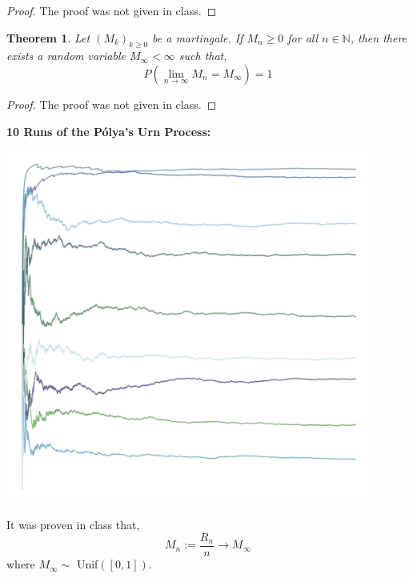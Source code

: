 \documentclass{tufte-handout}
\newtheorem{thm}{Theorem}
\begin{document}
\begin{proof}
  The proof was not given in class.
\end{proof}

\begin{thm}
  Let $(M_k)_{k \geq 0}$ be a martingale. If $M_n \geq 0$ for all $n \in \mathbb{N}$, then there exists a random variable $M_{\infty} < \infty$ such that,
  \[P\left(\lim _{n \rightarrow \infty} M_{n}=M_{\infty}\right)=1\]
\end{thm}

\begin{proof}
  The proof was not given in class.
\end{proof}

\begin{marginfigure}
      \textbf{10 Runs of the P\'{o}lya's Urn Process:}
      \begin{center}
        \includegraphics[width=0.9\textwidth]{fig-28.png}
        \caption{It was proven in class that, \[M_n := \frac{R_n}{n} \rightarrow M_{\infty}\] where $M_{\infty} \sim$ Unif$([0,1])$.}
      \end{center}
\end{marginfigure}
\end{document}
